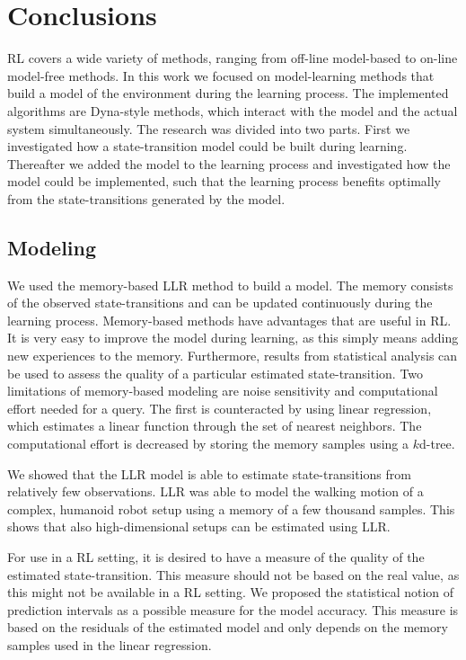 \chapter{Conclusions}\label{chap:Conclusions}

\ac{RL} covers a wide variety of methods, ranging from off-line model-based to on-line model-free methods. In this work we focused on model-learning methods that build a model of the environment during the learning process. The implemented algorithms are Dyna-style methods, which interact with the model and the actual system simultaneously. The research was divided into two parts. First we investigated how a state-transition model could be built during learning. Thereafter we added the model to the learning process and investigated how the model could be implemented, such that the learning process benefits optimally from the state-transitions generated by the model.




\section{Modeling}
We used the memory-based \ac{LLR} method to build a model. The memory consists of the observed state-transitions and can be updated continuously during the learning process. Memory-based methods have advantages that are useful in \ac{RL}. It is very easy to improve the model during learning, as this simply means adding new experiences to the memory. Furthermore, results from statistical analysis can be used to assess the quality of a particular estimated state-transition. Two limitations of memory-based modeling are noise sensitivity and computational effort needed for a query. The first is counteracted by using linear regression, which estimates a linear function through the set of nearest neighbors. The computational effort is decreased by storing the memory samples using a $k$d-tree.

We showed that the \ac{LLR} model is able to estimate state-transitions from relatively few observations. \ac{LLR} was able to model the walking motion of a complex, humanoid robot setup using a memory of a few thousand samples. This shows that also high-dimensional setups can be estimated using \ac{LLR}.

For use in a \ac{RL} setting, it is desired to have a measure of the quality of the estimated state-transition. This measure should not be based on the real value, as this might not be available in a \ac{RL} setting. We proposed the statistical notion of prediction intervals as a possible measure for the model accuracy. This measure is based on the residuals of the estimated model and only depends on the memory samples used in the linear regression.




